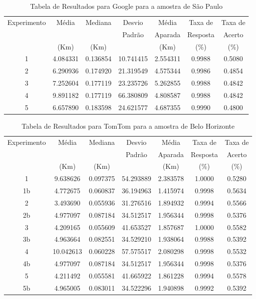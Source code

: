 \begin{anexosenv}
\begin{table}[ht]
\centering
\begin{tabular}{|c|c|c|c|c|c|c|}
\hline
Experimento & Média & Mediana & Desvio & Média & Taxa de & Taxa de \\
    & & & Padrão & Aparada & Resposta & Acerto \\
    & (Km) & (Km) & & (Km) & (\%) & (\%) \\ \hline
1 & 4.084331 & 0.136854 & 10.741415 & 2.554311 & 0.9988 & 0.5080 \\ \hline
2 & 6.290936 & 0.174920 & 21.319549 & 4.575344 & 0.9986 & 0.4854 \\ \hline
3 & 7.252604 & 0.177119 & 23.235726 & 5.262855 & 0.9988 & 0.4842 \\ \hline
4 & 9.891182 & 0.177119 & 66.380809 & 4.808587 & 0.9988 & 0.4842 \\ \hline
5 & 6.657890 & 0.183598 & 24.621577 & 4.687355 & 0.9990 & 0.4800 \\ \hline
\end{tabular}
\caption{Tabela de Resultados para Google para a amostra de São Paulo}
\label{tab:googleSP}
\end{table}
    
\begin{table}[ht]
\centering
\begin{tabular}{|c|c|c|c|c|c|c|}
\hline
Experimento & Média & Mediana & Desvio & Média & Taxa de & Taxa de \\
 & & & Padrão & Aparada & Resposta & Acerto \\
 & (Km) & (Km) & & (Km) & (\%) & (\%) \\ \hline
1 & 9.638626 & 0.097375 & 54.293889 & 2.383578 & 1.0000 & 0.5280 \\ \hline
1b & 4.772675 & 0.060837 & 36.194963 & 1.415974 & 0.9998 & 0.5634 \\ \hline
2 & 3.493690 & 0.055936 & 31.276516 & 1.894932 & 0.9994 & 0.5566 \\ \hline
2b & 4.977097 & 0.087184 & 34.512517 & 1.956344 & 0.9998 & 0.5376 \\ \hline
3 & 4.209165 & 0.055609 & 41.653527 & 1.857687 & 1.0000 & 0.5582 \\ \hline
3b & 4.963664 & 0.082551 & 34.529210 & 1.938064 & 0.9988 & 0.5392 \\ \hline
4 & 10.042613 & 0.060228 & 57.575517 & 2.080298 & 0.9998 & 0.5532 \\ \hline
4b & 4.977097 & 0.087184 & 34.512517 & 1.956344 & 0.9998 & 0.5376 \\ \hline
5 & 4.211492 & 0.055581 & 41.665922 & 1.861228 & 0.9994 & 0.5578 \\ \hline
5b & 4.965005 & 0.083011 & 34.522296 & 1.940898 & 0.9992 & 0.5392 \\ \hline
\end{tabular}
\caption{Tabela de Resultados para TomTom para a amostra de Belo Horizonte}
\label{tab:tomtomBH}
\end{table}


\end{anexosenv}
